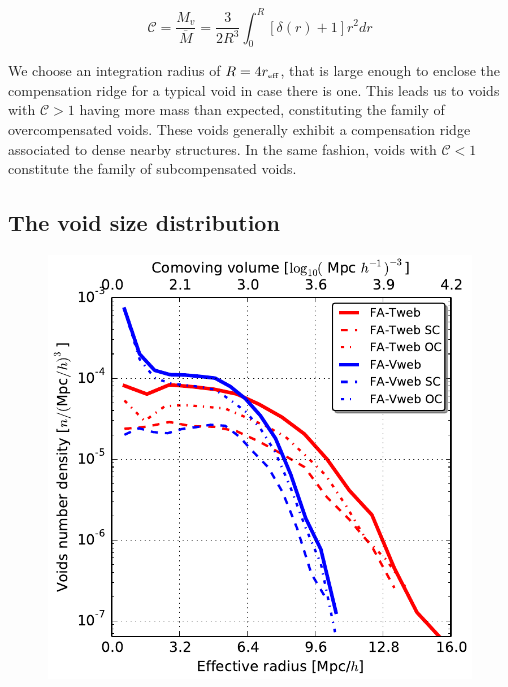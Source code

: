 \documentclass[a4,useAMS,usenatbib,usegraphicx]{mn2e}
\newcommand{\eq}[2]{\begin{equation} \label{eq:#1} #2 \end{equation}}
\newcommand{\reff}{{\ifmmode{r_{\mbox{\tiny eff}}}\else{$r_{\mbox{\tiny eff}}$}\fi}}
\begin{document}
\eq{compensation}
{\mathcal{C} = \frac{M_v}{\overline{M}} = \frac{3}{2R^{3}} \int_0^{R} [\delta(r) + 1] r^2 dr}

We choose an integration radius of $R=4\reff$, that is large enough to 
enclose the compensation ridge for a typical void in case there is one. 
This leads us to voids with $\mathcal{C}>1$ having more mass than expected, 
constituting the family of overcompensated voids. These voids generally 
exhibit a compensation ridge associated to dense nearby structures. In the 
same fashion, voids with $\mathcal{C}<1$ constitute the family of 
subcompensated voids.


\subsection{The void size distribution}
\label{subsec:shape_voids}


\begin{figure}
\centering

  \includegraphics[trim = 0mm 0mm 0mm 0mm, clip, keepaspectratio=true,
  width=0.3\textheight]{voids_regions_volume_all.pdf}


  \label{fig:volume_function}

\end{figure}
\end{document}
